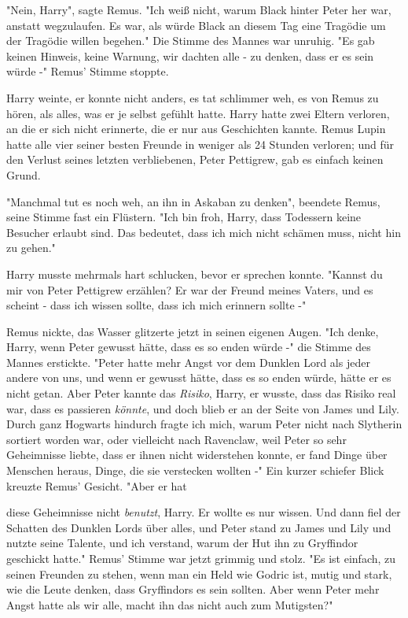 {"Nein, Harry", sagte Remus. "Ich weiß nicht, warum Black hinter Peter her war, anstatt wegzulaufen. Es war, als würde Black an diesem Tag eine Tragödie um der Tragödie willen begehen." Die Stimme des Mannes war unruhig. "Es gab keinen Hinweis, keine Warnung, wir dachten alle - zu denken, dass er es sein würde -" Remus' Stimme stoppte.

Harry weinte, er konnte nicht anders, es tat schlimmer weh, es von Remus zu hören, als alles, was er je selbst gefühlt hatte. Harry hatte zwei Eltern verloren, an die er sich nicht erinnerte, die er nur aus Geschichten kannte. Remus Lupin hatte alle vier seiner besten Freunde in weniger als 24 Stunden verloren; und für den Verlust seines letzten verbliebenen, Peter Pettigrew, gab es einfach keinen Grund.

"Manchmal tut es noch weh, an ihn in Askaban zu denken", beendete Remus, seine Stimme fast ein Flüstern. "Ich bin froh, Harry, dass Todessern keine Besucher erlaubt sind. Das bedeutet, dass ich mich nicht schämen muss, nicht hin zu gehen."

Harry musste mehrmals hart schlucken, bevor er sprechen konnte. "Kannst du mir von Peter Pettigrew erzählen? Er war der Freund meines Vaters, und es scheint - dass ich wissen sollte, dass ich mich erinnern sollte -"

Remus nickte, das Wasser glitzerte jetzt in seinen eigenen Augen. "Ich denke, Harry, wenn Peter gewusst hätte, dass es so enden würde -" die Stimme des Mannes erstickte. "Peter hatte mehr Angst vor dem Dunklen Lord als jeder andere von uns, und wenn er gewusst hätte, dass es so enden würde, hätte er es nicht getan. Aber Peter kannte das \emph{Risiko}, Harry, er wusste, dass das Risiko real war, dass es passieren \emph{könnte}, und doch blieb er an der Seite von James und Lily. Durch ganz Hogwarts hindurch fragte ich mich, warum Peter nicht nach Slytherin sortiert worden war, oder vielleicht nach Ravenclaw, weil Peter so sehr Geheimnisse liebte, dass er ihnen nicht widerstehen konnte, er fand Dinge über Menschen heraus, Dinge, die sie verstecken wollten -" Ein kurzer schiefer Blick kreuzte Remus' Gesicht. "Aber er hat

diese Geheimnisse nicht \emph{benutzt}, Harry. Er wollte es nur wissen. Und dann fiel der Schatten des Dunklen Lords über alles, und Peter stand zu James und Lily und nutzte seine Talente, und ich verstand, warum der Hut ihn zu Gryffindor geschickt hatte." Remus' Stimme war jetzt grimmig und stolz. "Es ist einfach, zu seinen Freunden zu stehen, wenn man ein Held wie Godric ist, mutig und stark, wie die Leute denken, dass Gryffindors es sein sollten. Aber wenn Peter mehr Angst hatte als wir alle, macht ihn das nicht auch zum Mutigsten?"

}

